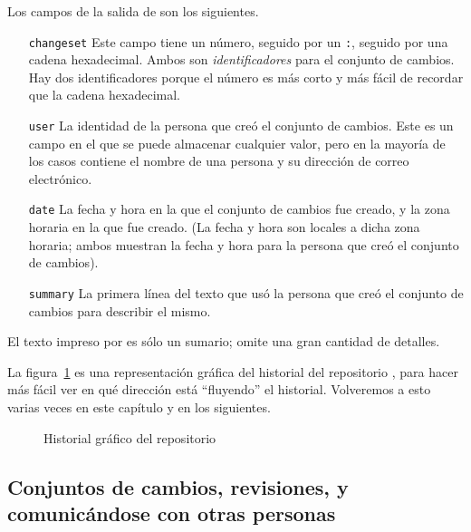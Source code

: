 Los campos de la salida de  son los siguientes.
\begin{itemize}
    \item[\texttt{changeset}]\hspace{-0.5em} Este campo
        tiene un número, seguido por un
        \texttt{:}, seguido por una cadena hexadecimal. Ambos son
        \emph{identificadores} para el conjunto de cambios. Hay dos
        identificadores porque el número es más corto y más fácil de
        recordar que la cadena hexadecimal.
        
\item[\texttt{user}]\hspace{-0.5em} La identidad de la
    persona que creó el conjunto de cambios. Este es un campo en el
    que se puede almacenar cualquier valor, pero en la mayoría de los
    casos contiene el nombre de una persona y su dirección de correo
    electrónico.
    
\item[\texttt{date}]\hspace{-0.5em} La fecha y hora en la
    que el conjunto de cambios fue creado, y la zona horaria en la que
    fue creado. (La fecha y hora son locales a dicha zona horaria;
    ambos muestran la fecha y hora para la persona que creó el
    conjunto de cambios).
    
\item[\texttt{summary}]\hspace{-0.5em} 
    La primera línea del texto que usó la persona que creó el conjunto
    de cambios para describir el mismo.
\end{itemize}
El texto impreso por  es sólo un sumario; omite una gran
cantidad de detalles.

La figura~\ref{fig:tour-basic:history} es una representación
gráfica del historial del repositorio , para hacer más
fácil ver en qué dirección está ``fluyendo'' el historial. Volveremos
a esto varias veces en este capítulo y en los siguientes.

\begin{figure}[ht]
  \centering
  \caption{Historial gráfico del repositorio }
  \label{fig:tour-basic:history}
\end{figure}

\subsection{Conjuntos de cambios, revisiones, y comunicándose con
otras personas}

